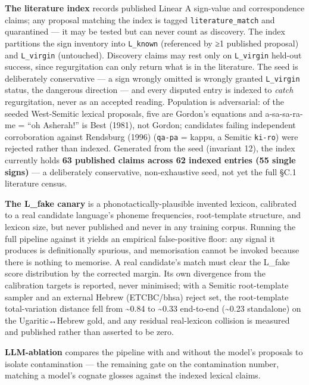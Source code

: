 \documentclass[
  10pt,
]{article}
\begin{document}
\textbf{The literature index} records published Linear A sign-value and
correspondence claims; any proposal matching the index is tagged
\texttt{literature\_match} and quarantined --- it may be tested but can
never count as discovery. The index partitions the sign inventory into
\texttt{L\_known} (referenced by ≥1 published proposal) and
\texttt{L\_virgin} (untouched). Discovery claims may rest only on
\texttt{L\_virgin} held-out success, since regurgitation can only return
what is in the literature. The seed is deliberately conservative --- a
sign wrongly omitted is wrongly granted \texttt{L\_virgin} status, the
dangerous direction --- and every disputed entry is indexed to
\emph{catch} regurgitation, never as an accepted reading. Population is
adversarial: of the seeded West-Semitic lexical proposals, five are
Gordon's equations and a-sa-sa-ra-me = ``oh Asherah!'' is Best (1981),
not Gordon; candidates failing independent corroboration against
Rendsburg (1996) (\texttt{qa-pa} = kappu, a Semitic \texttt{ki-ro}) were
rejected rather than indexed. Generated from the seed (invariant 12),
the index currently holds \textbf{63 published claims across 62 indexed
entries (55 single signs)} --- a deliberately conservative,
non-exhaustive seed, not yet the full §C.1 literature census.

\textbf{The L\_fake canary} is a phonotactically-plausible invented
lexicon, calibrated to a real candidate language's phoneme frequencies,
root-template structure, and lexicon size, but never published and never
in any training corpus. Running the full pipeline against it yields an
empirical false-positive floor: any signal it produces is definitionally
spurious, and memorisation cannot be invoked because there is nothing to
memorise. A real candidate's match must clear the L\_fake score
distribution by the corrected margin. Its own divergence from the
calibration targets is reported, never minimised; with a Semitic
root-template sampler and an external Hebrew (ETCBC/bhsa) reject set,
the root-template total-variation distance fell from \textasciitilde0.84
to \textasciitilde0.33 end-to-end (\textasciitilde0.23 standalone) on
the Ugaritic↔Hebrew gold, and any residual real-lexicon collision is
measured and published rather than asserted to be zero.

\textbf{LLM-ablation} compares the pipeline with and without the model's
proposals to isolate contamination --- the remaining gate on the
contamination number, matching a model's cognate glosses against the
indexed lexical claims.
\end{document}
